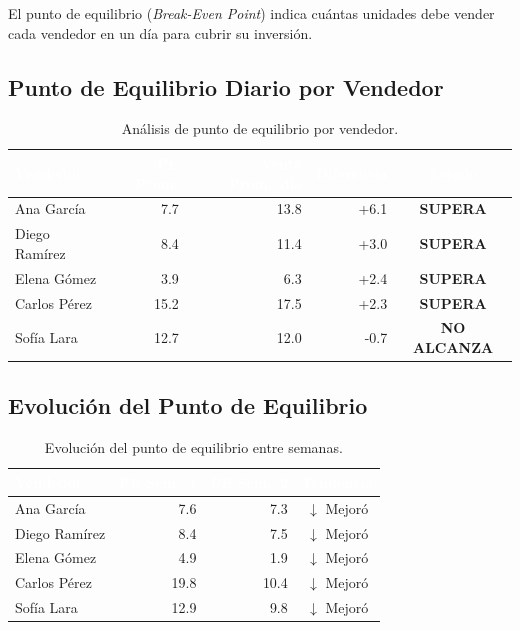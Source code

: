 \documentclass[12pt,letterpaper]{article}
\begin{document}
El punto de equilibrio (\textit{Break-Even Point}) indica cuántas unidades debe vender cada vendedor en un día para cubrir su inversión.

\subsection{Punto de Equilibrio Diario por Vendedor}

\begin{table}[H]
\centering
\footnotesize
{}
\begin{tabular}{l r r r c}
\toprule
\rowcolor{tabheader}
\textcolor{white}{\textbf{Vendedor}} &
\textcolor{white}{\textbf{PE Prom.}} &
\textcolor{white}{\textbf{Venta Prom./día}} &
\textcolor{white}{\textbf{Diferencia}} &
\textcolor{white}{\textbf{Estado}} \\
\midrule
Ana García      &  7.7 & 13.8 & +6.1  & \textcolor{success}{\textbf{SUPERA}} \\
Diego Ramírez   &  8.4 & 11.4 & +3.0  & \textcolor{success}{\textbf{SUPERA}} \\
Elena Gómez     &  3.9 &  6.3 & +2.4  & \textcolor{success}{\textbf{SUPERA}} \\
Carlos Pérez    & 15.2 & 17.5 & +2.3  & \textcolor{success}{\textbf{SUPERA}} \\
Sofía Lara      & 12.7 & 12.0 & -0.7  & \textcolor{danger}{\textbf{NO ALCANZA}} \\
\bottomrule
\end{tabular}
\caption{Análisis de punto de equilibrio por vendedor.}
\end{table}

\subsection{Evolución del Punto de Equilibrio}

\begin{table}[H]
\centering
\footnotesize
{}
\begin{tabular}{l r r c}
\toprule
\rowcolor{tabheader}
\textcolor{white}{\textbf{Vendedor}} &
\textcolor{white}{\textbf{PE Sem.~1}} &
\textcolor{white}{\textbf{PE Sem.~2}} &
\textcolor{white}{\textbf{Tendencia}} \\
\midrule
Ana García      & 7.6  & 7.3  & \textcolor{success}{$\downarrow$ Mejoró} \\
Diego Ramírez   & 8.4  & 7.5  & \textcolor{success}{$\downarrow$ Mejoró} \\
Elena Gómez     & 4.9  & 1.9  & \textcolor{success}{$\downarrow$ Mejoró} \\
Carlos Pérez    & 19.8 & 10.4 & \textcolor{success}{$\downarrow$ Mejoró} \\
Sofía Lara      & 12.9 & 9.8  & \textcolor{success}{$\downarrow$ Mejoró} \\
\bottomrule
\end{tabular}
\caption{Evolución del punto de equilibrio entre semanas.}
\end{table}
\end{document}
